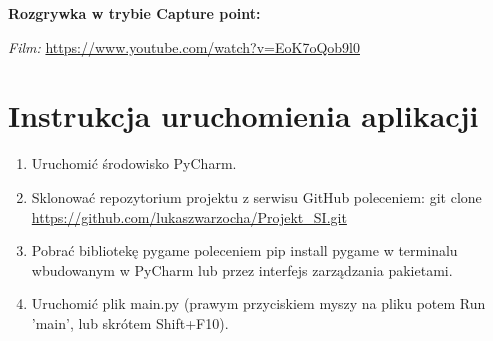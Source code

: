 \vspace{5pt}
\textbf{Rozgrywka w trybie Capture point:}

\textit{Film:} \href{https://www.youtube.com/watch?v=EoK7oQob9l0}{https://www.youtube.com/watch?v=EoK7oQob9l0}
 
\section{Instrukcja uruchomienia aplikacji}

\begin{enumerate}
    \item Uruchomić środowisko PyCharm.
    \item Sklonować repozytorium projektu z serwisu GitHub poleceniem: git clone \url{https://github.com/lukaszwarzocha/Projekt_SI.git}
    \item Pobrać bibliotekę pygame poleceniem pip install pygame w terminalu wbudowanym w PyCharm 
    lub przez interfejs zarządzania pakietami.
    \item Uruchomić plik main.py (prawym przyciskiem myszy na pliku potem Run 'main', lub skrótem Shift+F10).
\end{enumerate}

